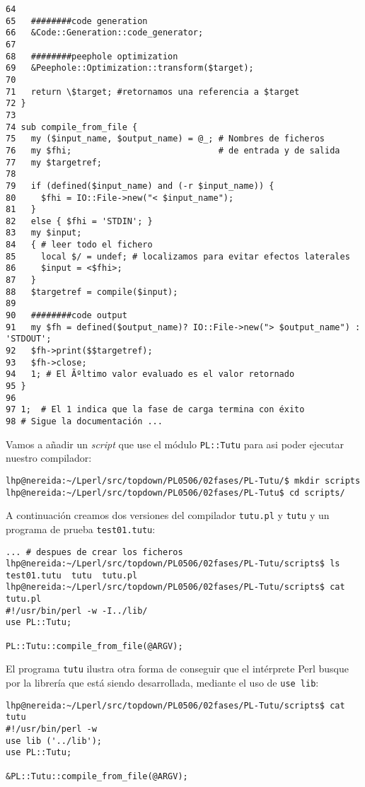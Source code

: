 \begin{verbatim}
64 
65   ########code generation
66   &Code::Generation::code_generator;
67 
68   ########peephole optimization
69   &Peephole::Optimization::transform($target);
70 
71   return \$target; #retornamos una referencia a $target
72 }
73 
74 sub compile_from_file {
75   my ($input_name, $output_name) = @_; # Nombres de ficheros
76   my $fhi;                             # de entrada y de salida
77   my $targetref;
78   
79   if (defined($input_name) and (-r $input_name)) {
80     $fhi = IO::File->new("< $input_name");
81   }
82   else { $fhi = 'STDIN'; }
83   my $input;
84   { # leer todo el fichero
85     local $/ = undef; # localizamos para evitar efectos laterales
86     $input = <$fhi>;
87   }
88   $targetref = compile($input);
89 
90   ########code output
91   my $fh = defined($output_name)? IO::File->new("> $output_name") : 'STDOUT';
92   $fh->print($$targetref);
93   $fh->close;
94   1; # El Ãºltimo valor evaluado es el valor retornado
95 }
96 
97 1;  # El 1 indica que la fase de carga termina con éxito
98 # Sigue la documentación ...
\end{verbatim}


Vamos a añadir un \emph{script} que use el módulo
\verb|PL::Tutu| para asi poder ejecutar nuestro compilador:
\begin{verbatim}
lhp@nereida:~/Lperl/src/topdown/PL0506/02fases/PL-Tutu/$ mkdir scripts
lhp@nereida:~/Lperl/src/topdown/PL0506/02fases/PL-Tutu$ cd scripts/
\end{verbatim}
A continuación creamos dos versiones del compilador \verb|tutu.pl|
y \verb|tutu| y un programa de prueba \verb|test01.tutu|:

\begin{verbatim}
... # despues de crear los ficheros
lhp@nereida:~/Lperl/src/topdown/PL0506/02fases/PL-Tutu/scripts$ ls
test01.tutu  tutu  tutu.pl
lhp@nereida:~/Lperl/src/topdown/PL0506/02fases/PL-Tutu/scripts$ cat tutu.pl
#!/usr/bin/perl -w -I../lib/
use PL::Tutu;

PL::Tutu::compile_from_file(@ARGV);
\end{verbatim}


El programa \verb|tutu| ilustra otra forma de conseguir que el intérprete
Perl busque por la librería que está siendo desarrollada, mediante el
uso de \verb|use lib|:

\begin{verbatim}
lhp@nereida:~/Lperl/src/topdown/PL0506/02fases/PL-Tutu/scripts$ cat tutu
#!/usr/bin/perl -w
use lib ('../lib');
use PL::Tutu;

&PL::Tutu::compile_from_file(@ARGV);
\end{verbatim}


